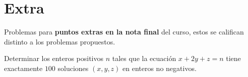 \section{Extra}

Problemas para \textbf{puntos extras en la nota final} del curso, estos se califican distinto a los problemas propuestos.
\begin{problem}
    Determinar los enteros positivos $n$ tales que la ecuación $x + 2y + z = n$ tiene exactamente $100$ soluciones
    $(x,y,z)$ en enteros no negativos.
\end{problem}